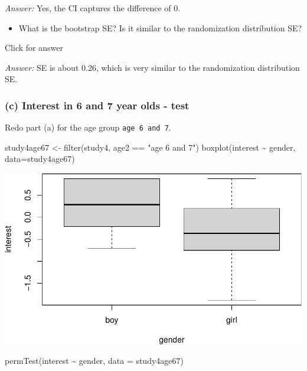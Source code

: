 \documentclass[
]{book}
\newenvironment{Shaded}{\begin{snugshade}}{\end{snugshade}}
\newcommand{\AttributeTok}[1]{\textcolor[rgb]{0.77,0.63,0.00}{#1}}
\newcommand{\FunctionTok}[1]{\textcolor[rgb]{0.00,0.00,0.00}{#1}}
\newcommand{\NormalTok}[1]{#1}
\newcommand{\OtherTok}[1]{\textcolor[rgb]{0.56,0.35,0.01}{#1}}
\newcommand{\SpecialCharTok}[1]{\textcolor[rgb]{0.00,0.00,0.00}{#1}}
\newcommand{\StringTok}[1]{\textcolor[rgb]{0.31,0.60,0.02}{#1}}
\providecommand{\tightlist}{%
  \setlength{\itemsep}{0pt}\setlength{\parskip}{0pt}}
\begin{document}
\emph{Answer:} Yes, the CI captures the difference of 0.

\begin{itemize}
\tightlist
\item
  What is the bootstrap SE? Is it similar to the randomization distribution SE?
\end{itemize}

Click for answer

\emph{Answer:} SE is about 0.26, which is very similar to the randomization distribution SE.

\hypertarget{c-interest-in-6-and-7-year-olds---test}{%
\subsubsection{(c) Interest in 6 and 7 year olds - test}\label{c-interest-in-6-and-7-year-olds---test}}

Redo part (a) for the age group \texttt{age\ 6\ and\ 7}.

\begin{Shaded}
\begin{Highlighting}[]
\NormalTok{study4age67 }\OtherTok{\textless{}{-}} \FunctionTok{filter}\NormalTok{(study4, age2 }\SpecialCharTok{==} \StringTok{"age 6 and 7"}\NormalTok{)}
\FunctionTok{boxplot}\NormalTok{(interest }\SpecialCharTok{\textasciitilde{}}\NormalTok{ gender, }\AttributeTok{data=}\NormalTok{study4age67)}
\end{Highlighting}
\end{Shaded}

\includegraphics[width=1\linewidth]{Class_Activity_14_files/figure-latex/unnamed-chunk-6-1}

\begin{Shaded}
\begin{Highlighting}[]
\FunctionTok{permTest}\NormalTok{(interest }\SpecialCharTok{\textasciitilde{}}\NormalTok{ gender, }\AttributeTok{data =}\NormalTok{ study4age67)}
\end{Highlighting}
\end{Shaded}
\end{document}
